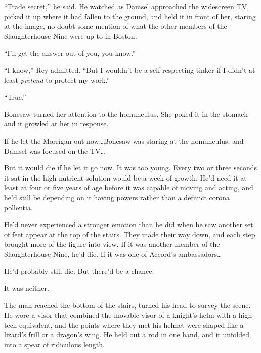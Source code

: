 ``Trade secret,'' he said.  He watched as Damsel approached the widescreen TV, picked it up where it had fallen to the ground, and held it in front of her, staring at the image, no doubt some mention of what the other members of the Slaughterhouse Nine were up to in Boston.



``I'll get the answer out of you, you know.''



``I know,'' Rey admitted.  ``But I wouldn't be a self-respecting tinker if I didn't at least \emph{pretend} to protect my work.''



``True.''



Bonesaw turned her attention to the homunculus.  She poked it in the stomach and it growled at her in response.



If he let the Morr\'{i}gan out now\ldots Bonesaw was staring at the homunculus, and Damsel was focused on the TV\ldots



But it would die if he let it go now.  It was too young.  Every two or three seconds it sat in the high-nutrient solution would be a week of growth.  He'd need it at least at four or five years of age before it was capable of moving and acting, and he'd still be depending on it having powers rather than a defunct corona pollentia.



He'd never experienced a stronger emotion than he did when he saw another set of feet appear at the top of the stairs.  They made their way down, and each step brought more of the figure into view.  If it was another member of the Slaughterhouse Nine, he'd die.  If it was one of Accord's ambassadors\ldots



He'd probably still die.  But there'd be a chance.



It was neither.



The man reached the bottom of the stairs, turned his head to survey the scene.  He wore a visor that combined the movable visor of a knight's helm with a high-tech equivalent, and the points where they met his helmet were shaped like a lizard's frill or a dragon's wing.  He held out a rod in one hand, and it unfolded into a spear of ridiculous length.



